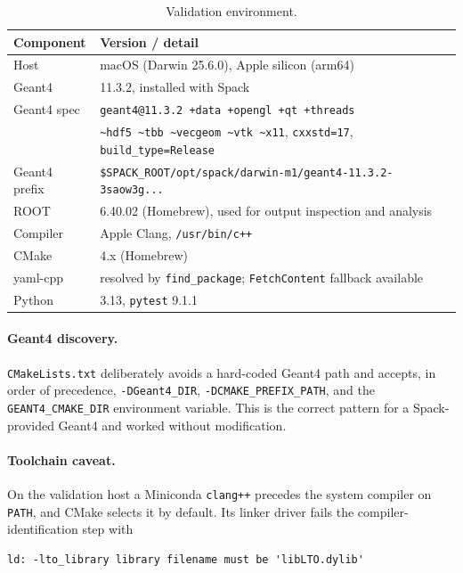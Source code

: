 \documentclass[a4paper,11pt]{article}
\begin{document}
\begin{table}[htbp]
\centering
\caption{\label{tab:env}Validation environment.}
\begin{tabular}{ll}
\toprule
Component & Version / detail \\
\midrule
Host            & macOS (Darwin 25.6.0), Apple silicon (arm64) \\
Geant4          & 11.3.2, installed with Spack \\
Geant4 spec     & \texttt{geant4@11.3.2 +data +opengl +qt +threads} \\
                & \texttt{\textasciitilde{}hdf5 \textasciitilde{}tbb \textasciitilde{}vecgeom \textasciitilde{}vtk \textasciitilde{}x11}, \texttt{cxxstd=17}, \texttt{build\_type=Release} \\
Geant4 prefix   & \texttt{\$SPACK\_ROOT/opt/spack/darwin-m1/geant4-11.3.2-3saow3g...} \\
ROOT            & 6.40.02 (Homebrew), used for output inspection and analysis \\
Compiler        & Apple Clang, \texttt{/usr/bin/c++} \\
CMake           & 4.x (Homebrew) \\
yaml-cpp        & resolved by \texttt{find\_package}; \texttt{FetchContent} fallback available \\
Python          & 3.13, \texttt{pytest} 9.1.1 \\
\bottomrule
\end{tabular}
\end{table}

\paragraph{Geant4 discovery.} \texttt{CMakeLists.txt} deliberately avoids a
hard-coded Geant4 path and accepts, in order of precedence, \texttt{-DGeant4\_DIR},
\texttt{-DCMAKE\_PREFIX\_PATH}, and the \texttt{GEANT4\_CMAKE\_DIR} environment
variable. This is the correct pattern for a Spack-provided Geant4 and worked
without modification.

\paragraph{Toolchain caveat.} \label{par:conda} On the validation host a
Miniconda \texttt{clang++} precedes the system compiler on \texttt{PATH}, and
CMake selects it by default. Its linker driver fails the compiler-identification
step with

\begin{lstlisting}
ld: -lto_library library filename must be 'libLTO.dylib'
\end{lstlisting}
\end{document}
